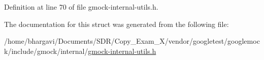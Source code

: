 Definition at line 70 of file gmock-\/internal-\/utils.\+h.



The documentation for this struct was generated from the following file\+:\begin{DoxyCompactItemize}
\item 
/home/bhargavi/\+Documents/\+S\+D\+R/\+Copy\+\_\+\+Exam\+\_\+X/vendor/googletest/googlemock/include/gmock/internal/\hyperlink{gmock-internal-utils_8h}{gmock-\/internal-\/utils.\+h}\end{DoxyCompactItemize}

